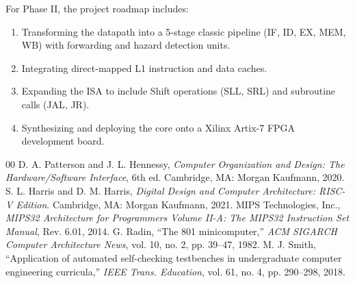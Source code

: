 \documentclass[conference]{IEEEtran}
\begin{document}
For Phase II, the project roadmap includes:
\begin{enumerate}
    \item Transforming the datapath into a 5-stage classic pipeline (IF, ID, EX, MEM, WB) with forwarding and hazard detection units.
    \item Integrating direct-mapped L1 instruction and data caches.
    \item Expanding the ISA to include Shift operations (SLL, SRL) and subroutine calls (JAL, JR).
    \item Synthesizing and deploying the core onto a Xilinx Artix-7 FPGA development board.
\end{enumerate}

\begin{thebibliography}{00}
 D. A. Patterson and J. L. Hennessy, \textit{Computer Organization and Design: The Hardware/Software Interface}, 6th ed. Cambridge, MA: Morgan Kaufmann, 2020.
 S. L. Harris and D. M. Harris, \textit{Digital Design and Computer Architecture: RISC-V Edition}. Cambridge, MA: Morgan Kaufmann, 2021.
 MIPS Technologies, Inc., \textit{MIPS32 Architecture for Programmers Volume II-A: The MIPS32 Instruction Set Manual}, Rev. 6.01, 2014.
 G. Radin, ``The 801 minicomputer,'' \textit{ACM SIGARCH Computer Architecture News}, vol. 10, no. 2, pp. 39--47, 1982.
 M. J. Smith, ``Application of automated self-checking testbenches in undergraduate computer engineering curricula,'' \textit{IEEE Trans. Education}, vol. 61, no. 4, pp. 290--298, 2018.
\end{thebibliography}
\end{document}
